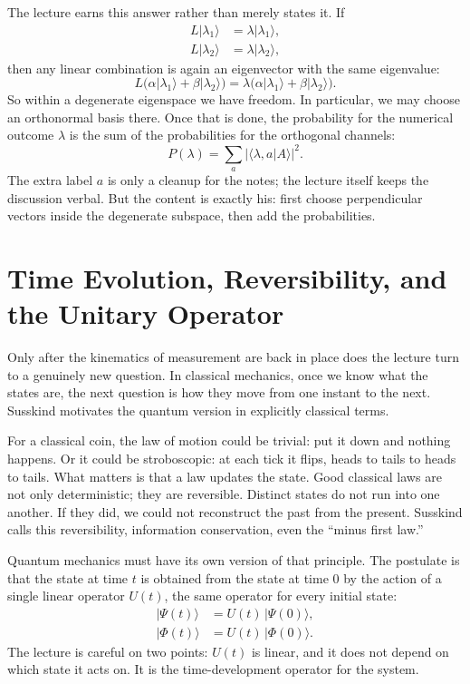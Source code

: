 The lecture earns this answer rather than merely states it. If
\begin{align}
L|\lambda_1\rangle &= \lambda |\lambda_1\rangle,\\
L|\lambda_2\rangle &= \lambda |\lambda_2\rangle,
\end{align}
then any linear combination is again an eigenvector with the same eigenvalue:
\begin{equation}
L\bigl(\alpha|\lambda_1\rangle+\beta|\lambda_2\rangle\bigr)
=
\lambda\bigl(\alpha|\lambda_1\rangle+\beta|\lambda_2\rangle\bigr).
\end{equation}
So within a degenerate eigenspace we have freedom. In particular, we may choose an orthonormal basis there. Once that is done, the probability for the numerical outcome \(\lambda\) is the sum of the probabilities for the orthogonal channels:
\begin{equation}
P(\lambda)=\sum_a |\langle \lambda,a|A\rangle|^2.
\end{equation}
The extra label \(a\) is only a cleanup for the notes; the lecture itself keeps the discussion verbal. But the content is exactly his: first choose perpendicular vectors inside the degenerate subspace, then add the probabilities.

\section{Time Evolution, Reversibility, and the Unitary Operator}

Only after the kinematics of measurement are back in place does the lecture turn to a genuinely new question. In classical mechanics, once we know what the states are, the next question is how they move from one instant to the next. Susskind motivates the quantum version in explicitly classical terms.

For a classical coin, the law of motion could be trivial: put it down and nothing happens. Or it could be stroboscopic: at each tick it flips, heads to tails to heads to tails. What matters is that a law updates the state. Good classical laws are not only deterministic; they are reversible. Distinct states do not run into one another. If they did, we could not reconstruct the past from the present. Susskind calls this reversibility, information conservation, even the ``minus first law.''

Quantum mechanics must have its own version of that principle. The postulate is that the state at time \(t\) is obtained from the state at time \(0\) by the action of a single linear operator \(U(t)\), the same operator for every initial state:
\begin{align}
|\Psi(t)\rangle &= U(t)\,|\Psi(0)\rangle,\\
|\Phi(t)\rangle &= U(t)\,|\Phi(0)\rangle.
\end{align}
The lecture is careful on two points: \(U(t)\) is linear, and it does not depend on which state it acts on. It is the time-development operator for the system.

